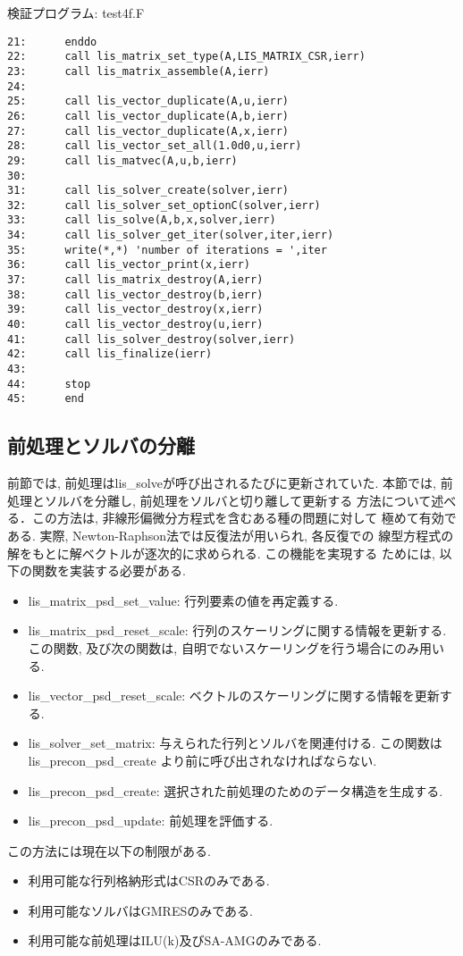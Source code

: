 \documentclass[a4paper]{jarticle}
\begin{document}
{{\begin{itembox}[l]{検証プログラム: test4f.F}
{\begin{verbatim}
21:      enddo
22:      call lis_matrix_set_type(A,LIS_MATRIX_CSR,ierr)
23:      call lis_matrix_assemble(A,ierr)
24:
25:      call lis_vector_duplicate(A,u,ierr)
26:      call lis_vector_duplicate(A,b,ierr)
27:      call lis_vector_duplicate(A,x,ierr)
28:      call lis_vector_set_all(1.0d0,u,ierr)
29:      call lis_matvec(A,u,b,ierr)
30:
31:      call lis_solver_create(solver,ierr)
32:      call lis_solver_set_optionC(solver,ierr)
33:      call lis_solve(A,b,x,solver,ierr)
34:      call lis_solver_get_iter(solver,iter,ierr)
35:      write(*,*) 'number of iterations = ',iter
36:      call lis_vector_print(x,ierr)
37:      call lis_matrix_destroy(A,ierr)
38:      call lis_vector_destroy(b,ierr)
39:      call lis_vector_destroy(x,ierr)
40:      call lis_vector_destroy(u,ierr)
41:      call lis_solver_destroy(solver,ierr)
42:      call lis_finalize(ierr)
43:
44:      stop
45:      end
\end{verbatim}
}
\end{itembox}

\newpage
\subsection{前処理とソルバの分離}
前節では, 前処理はlis\_solveが呼び出されるたびに更新されていた. 
本節では, 前処理とソルバを分離し, 前処理をソルバと切り離して更新する
方法について述べる．この方法は, 非線形偏微分方程式を含むある種の問題に対して
極めて有効である. 実際, Newton-Raphson法では反復法が用いられ, 各反復での
線型方程式の解をもとに解ベクトルが逐次的に求められる. この機能を実現する
ためには, 以下の関数を実装する必要がある.  
%
\begin{itemize}
\item lis\_matrix\_psd\_set\_value: 行列要素の値を再定義する. 
\item lis\_matrix\_psd\_reset\_scale: 行列のスケーリングに関する情報を更新する. この関数, 及び次の関数は, 自明でないスケーリングを行う場合にのみ用いる. 
\item lis\_vector\_psd\_reset\_scale: ベクトルのスケーリングに関する情報を更新する. 
\item lis\_solver\_set\_matrix: 与えられた行列とソルバを関連付ける. この関数は lis\_precon\_psd\_create より前に呼び出されなければならない. 
\item lis\_precon\_psd\_create: 選択された前処理のためのデータ構造を生成する. 
\item lis\_precon\_psd\_update: 前処理を評価する. 
\end{itemize}
%
この方法には現在以下の制限がある. 
%
\begin{itemize}
\item 利用可能な行列格納形式はCSRのみである. 
\item 利用可能なソルバはGMRESのみである. 
\item 利用可能な前処理はILU(k)及びSA-AMGのみである. 
\end{itemize}
%

}}
\end{document}

